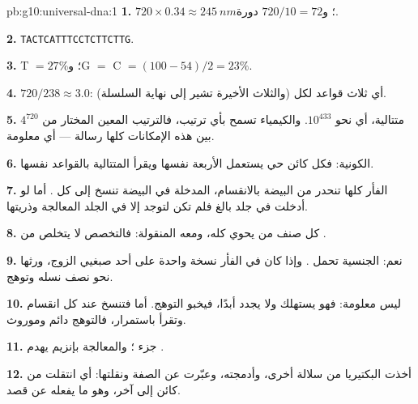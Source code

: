 \begin{solution}{pb:g10:universal-dna:1}
\textbf{1.} $720 \times 0.34 \approx \qty{245}{nm}$؛ و$720/10 = 72$
دورة.

\textbf{2.} \texttt{TACTCATTTCCTCTTCTTG}.

\textbf{3.} T $= 27\%$؛ وG $=$ C $= (100 - 54)/2 = 23\%$.

\textbf{4.} $720/238 \approx 3.0$: أي ثلاث قواعد لكل 
(والثلاث الأخيرة تشير إلى نهاية السلسلة).

\textbf{5.} $4^{720}$ متتالية، أي نحو $10^{433}$. والكيمياء تسمح بأي
ترتيب، فالترتيب المعين المختار من بين هذه الإمكانات كلها رسالة ---
أي معلومة.

\textbf{6.} الكونية: فكل كائن حي يستعمل  الأربعة نفسها
ويقرأ المتتالية بالقواعد نفسها.

\textbf{7.}  الفأر كلها تنحدر من البيضة بالانقسام، 
المدخلة في البيضة تنسخ إلى كل . أما لو أدخلت في جلد بالغ فلم تكن
لتوجد إلا في  الجلد المعالجة وذريتها.

\textbf{8.} كل صنف من  يحوي  كله، ومعه  المنقولة:
فالتخصص لا يتخلص من .

\textbf{9.} نعم:  الجنسية تحمل . وإذا كان في الفأر
نسخة واحدة على أحد صبغيي الزوج، ورثها نحو نصف نسله وتوهج.

\textbf{10.}  ليس معلومة: فهو يستهلك ولا يجدد أبدًا، فيخبو
التوهج. أما  فتنسخ عند كل انقسام وتقرأ باستمرار، فالتوهج دائم
وموروث.

\textbf{11.} جزء ؛ والمعالجة بإنزيم يهدم .

\textbf{12.} أخذت البكتيريا  من سلالة أخرى، وأدمجته، وعبّرت عن
الصفة ونقلتها: أي  انتقلت من كائن إلى آخر، وهو ما يفعله  عن قصد.


\end{solution}
